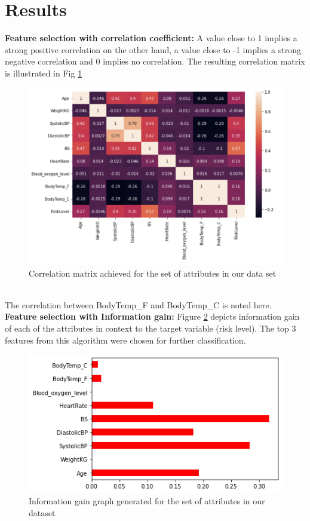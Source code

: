 \documentclass[conference]{IEEEtran}
\begin{document}
\section{Results}

\textbf{Feature selection with correlation coefficient:}
 A value close to 1 implies a strong positive correlation on the other hand, a value close to -1 implies a strong negative correlation and 0 implies no correlation. The resulting correlation matrix is illustrated in Fig \ref{fig:corrmatrix}
\begin{figure}[!h]
    \centering
    \includegraphics[width=\columnwidth]{Screen Shot 2022-04-15 at 1.28.37 PM.png}
    \caption{Correlation matrix achieved for the set of attributes in our data set}
    \label{fig:corrmatrix}
\end{figure}
\\ The correlation between BodyTemp\_F and BodyTemp\_C is noted here.
\\
\textbf{Feature selection with Information gain:}
Figure \ref{fig:iggraph} depicts information gain of each of the attributes in context to the target variable (risk level). The top 3 features from this algorithm were chosen for further classification. \\
\begin{figure}[!h]
    \centering
    \includegraphics[width=\columnwidth]{Information_gain.png}
    \caption{Information gain graph generated for the set of attributes in our dataset}
    \label{fig:iggraph}
\end{figure}
\end{document}
